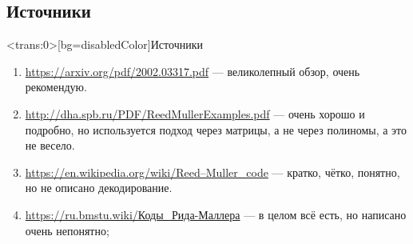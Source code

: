 \documentclass[beameroptions={aspectratio=169}]{beamerswitch}
\begin{document}
\begin{nonspeaker}
\section{Источники}
\begin{frame}<trans:0>[bg=disabledColor]{Источники}
    \begin{enumerate}
        \item \url{https://arxiv.org/pdf/2002.03317.pdf} — великолепный обзор, очень рекомендую.
        \item \url{http://dha.spb.ru/PDF/ReedMullerExamples.pdf} — очень хорошо и подробно, но используется подход через матрицы, а не через полиномы, а это не весело.
        \item \url{https://en.wikipedia.org/wiki/Reed–Muller_code} — кратко, чётко, понятно, но не описано декодирование.
        \item \url{https://ru.bmstu.wiki/Коды\_Рида-Маллера} — в целом всё есть, но написано очень непонятно;
    \end{enumerate}
\end{frame}
\end{nonspeaker}

\appendix
{}
\end{document}
